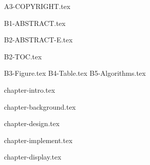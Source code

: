 \documentclass[12pt,openany,a4paper,fancyhdr,twoside]{ctexbook}
\newcommand{\clearPaperPage}{\clearpage}
\newcommand{\banxiaosi}{\fontsize{13pt}{19.5pt}\selectfont}    %
\newcommand{\xiaosi}{\fontsize{12pt}{18pt}\selectfont}            %
\begin{document}

\clearPaperPage



\clearPaperPage
 {A3-COPYRIGHT.tex}

\clearPaperPage




\clearPaperPage
{}
\pagestyle{plain}



 {B1-ABSTRACT.tex}

\clearPaperPage
 {B2-ABSTRACT-E.tex}
\clearPaperPage



 {B2-TOC.tex}



\clearPaperPage

 {B3-Figure.tex}
\clearPaperPage
 {B4-Table.tex}
\clearPaperPage
 {B5-Algorithms.tex}





\clearPaperPage
{}
\pagestyle{fancy}
\fancyhead[RE,LO]{ \leftmark}





\setlength{\baselineskip}{25pt}  %





\raggedbottom
\xiaosi
\clearPaperPage


 {chapter-intro.tex}
\clearPaperPage


 {chapter-background.tex}
\clearPaperPage



\clearPaperPage
 {chapter-design.tex}

\clearPaperPage


 {chapter-implement.tex}
\clearPaperPage

 {chapter-display.tex}

\clearPaperPage

\end{document}
